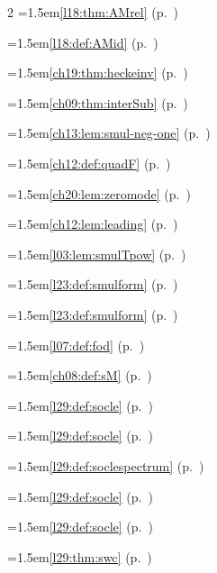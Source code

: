 \begin{multicols}{2}
\hangindent=1.5em\quad \ref{l18:thm:AMrel} (p.~\pageref{l18:thm:AMrel})\par
\hangindent=1.5em\quad \ref{l18:def:AMid} (p.~\pageref{l18:def:AMid})\par
\hangindent=1.5em\quad \ref{ch19:thm:heckeinv} (p.~\pageref{ch19:thm:heckeinv})\par
\hangindent=1.5em\quad \ref{ch09:thm:interSub} (p.~\pageref{ch09:thm:interSub})\par
\hangindent=1.5em\quad \ref{ch13:lem:smul-neg-one} (p.~\pageref{ch13:lem:smul-neg-one})\par
\hangindent=1.5em\quad \ref{ch12:def:quadF} (p.~\pageref{ch12:def:quadF})\par
\hangindent=1.5em\quad \ref{ch20:lem:zeromode} (p.~\pageref{ch20:lem:zeromode})\par
\hangindent=1.5em\quad \ref{ch12:lem:leading} (p.~\pageref{ch12:lem:leading})\par
\hangindent=1.5em\quad \ref{l03:lem:smulTpow} (p.~\pageref{l03:lem:smulTpow})\par
\hangindent=1.5em\quad \ref{l23:def:smulform} (p.~\pageref{l23:def:smulform})\par
\hangindent=1.5em\quad \ref{l23:def:smulform} (p.~\pageref{l23:def:smulform})\par
\hangindent=1.5em\quad \ref{l07:def:fod} (p.~\pageref{l07:def:fod})\par
\hangindent=1.5em\quad \ref{ch08:def:sM} (p.~\pageref{ch08:def:sM})\par
\hangindent=1.5em\quad \ref{l29:def:socle} (p.~\pageref{l29:def:socle})\par
\hangindent=1.5em\quad \ref{l29:def:socle} (p.~\pageref{l29:def:socle})\par
\hangindent=1.5em\quad \ref{l29:def:soclespectrum} (p.~\pageref{l29:def:soclespectrum})\par
\hangindent=1.5em\quad \ref{l29:def:socle} (p.~\pageref{l29:def:socle})\par
\hangindent=1.5em\quad \ref{l29:def:socle} (p.~\pageref{l29:def:socle})\par
\hangindent=1.5em\quad \ref{l29:thm:swc} (p.~\pageref{l29:thm:swc})\par

\end{multicols}
